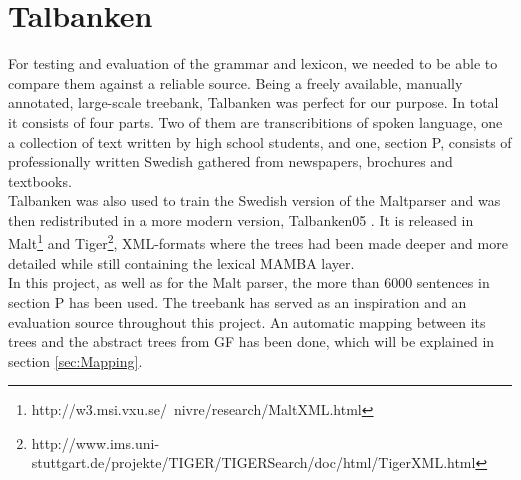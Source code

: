 \documentclass{report}
\begin{document}
%
%


\section{Talbanken}
\label{sec:talbanken}
For testing and evaluation of the grammar and lexicon, we needed to be able to
compare them against a reliable source.
Being a freely available, manually annotated, large-scale treebank,
Talbanken \cite{talbanken} was perfect for our purpose.
In total it consists of four
parts. Two of them are transcribitions of spoken language, one a collection of
text written by high school students, and one, section P,
consists of professionally written Swedish gathered from newspapers, brochures and textbooks.\\
Talbanken was also used to train the Swedish version of the Maltparser \cite{malt}
and was then redistributed in a more modern version, Talbanken05 \cite{talbanken05}.
It is released in Malt\footnote{http://w3.msi.vxu.se/~nivre/research/MaltXML.html} 
and Tiger\footnote{http://www.ims.uni-stuttgart.de/projekte/TIGER/TIGERSearch/doc/html/TigerXML.html},
XML-formats
where the trees had been made deeper and more detailed while still containing
the lexical MAMBA layer. \\
In this project, as well as for the Malt parser, the more than 6000 sentences
in section P has been used.
The treebank has served as an inspiration and an evaluation source throughout this
project. An automatic mapping between its trees and the abstract trees from GF has been
done, which will be explained in section \ref{sec:Mapping}.
\end{document}
